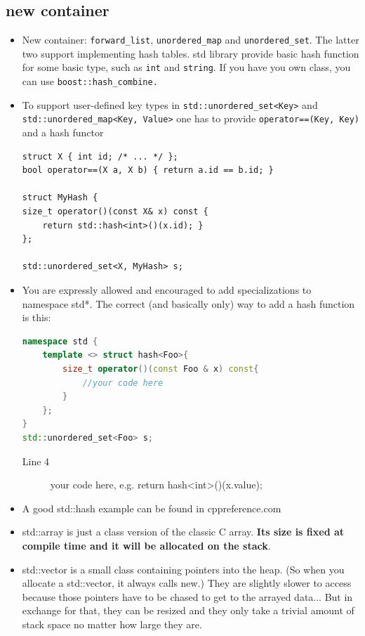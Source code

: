 \documentclass[a4paper,11pt,twoside]{book}
\begin{document}
\subsection{new container}
\begin{itemize}

\item New container: \texttt{forward\_list}, \texttt{unordered\_map} and \texttt{unordered\_set}.  The latter two support implementing hash tables. std library provide basic hash function for some basic type, such as \texttt{int} and \texttt{string}. If you have you own class, you can use \texttt{boost::hash\_combine.} 

\item To support user-defined key types in \texttt{std::unordered\_set<Key>} and \texttt{std::unordered\_map<Key, Value>} one has to provide \texttt{operator==(Key, Key)} and a hash functor
\begin{lstlisting}[numbers=none]
struct X { int id; /* ... */ };
bool operator==(X a, X b) { return a.id == b.id; }

struct MyHash {
size_t operator()(const X& x) const { 
	return std::hash<int>()(x.id); }
};

std::unordered_set<X, MyHash> s;
\end{lstlisting}

\item You are expressly allowed and encouraged to add specializations to namespace std*. The correct (and basically only) way to add a hash function is this:
\begin{lstlisting}[frame=single, language=c++]
namespace std {
	template <> struct hash<Foo>{
		size_t operator()(const Foo & x) const{
			//your code here
		}
	};
}
std::unordered_set<Foo> s;
\end{lstlisting}

\begin{description}
	\item[Line 4] your code here, e.g. return hash<int>()(x.value);
\end{description}
\item A good std::hash example can be found in cppreference.com 

\item std::array is just a class version of the classic C array. \textbf{Its size is fixed at compile time and it will be allocated  on the stack}.

\item std::vector is a small class containing pointers into the heap. (So when you allocate a std::vector, it always calls new.) They are slightly slower to access because those pointers have to be chased to get to the arrayed data... But in exchange for that, they can be resized and they only take a trivial amount of stack space no matter how large they are.



\end{itemize}
\end{document}
